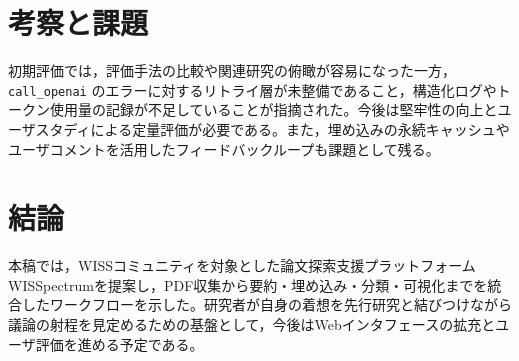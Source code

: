 \documentclass[twoside]{wiss}
\begin{document}
\section{考察と課題}
初期評価では，評価手法の比較や関連研究の俯瞰が容易になった一方， \texttt{call\_openai} のエラーに対するリトライ層が未整備であること，構造化ログやトークン使用量の記録が不足していることが指摘された。今後は堅牢性の向上とユーザスタディによる定量評価が必要である。また，埋め込みの永続キャッシュやユーザコメントを活用したフィードバックループも課題として残る。

\section{結論}
本稿では，WISSコミュニティを対象とした論文探索支援プラットフォームWISSpectrumを提案し，PDF収集から要約・埋め込み・分類・可視化までを統合したワークフローを示した。研究者が自身の着想を先行研究と結びつけながら議論の射程を見定めるための基盤として，今後はWebインタフェースの拡充とユーザ評価を進める予定である。
\end{document}
